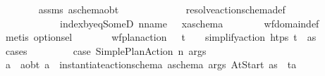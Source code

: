 \begin{isabellebody}
\ \ \ \ \ \ \isamarkupfalse%
\ assms\ a\isactrlsub s\isactrlsub c\isactrlsub h\isactrlsub e\isactrlsub m\isactrlsub a{\isacharunderscore}{\kern0pt}obt\ \isanewline
\ \ \ \ \ \ \ \ \ \ \ \ resolve{\isacharunderscore}{\kern0pt}action{\isacharunderscore}{\kern0pt}schema{\isacharunderscore}{\kern0pt}def\ \isanewline
\ \ \ \ \ \ \ \ \ \ \ \ index{\isacharunderscore}{\kern0pt}by{\isacharunderscore}{\kern0pt}eq{\isacharunderscore}{\kern0pt}SomeD{\isacharbrackleft}{\kern0pt}\ n{\isacharequal}{\kern0pt}{\isachardoublequoteopen}name\ {\isasympi}{\isachardoublequoteclose}\ \ x{\isacharequal}{\kern0pt}{\isachardoublequoteopen}a\isactrlsub s\isactrlsub c\isactrlsub h\isactrlsub e\isactrlsub m\isactrlsub a{\isachardoublequoteclose}{\isacharbrackright}{\kern0pt}\isanewline
\ \ \ \ \ \ \isamarkupfalse%
\ wf{\isacharunderscore}{\kern0pt}domain{\isacharunderscore}{\kern0pt}def\ \isamarkupfalse%
\ {\isacharparenleft}{\kern0pt}metis\ option{\isachardot}{\kern0pt}sel{\isacharparenright}{\kern0pt}\isanewline
\ \ \ \ \isamarkupfalse%
\ \isamarkupfalse%
\ {\isachardoublequoteopen}wf{\isacharunderscore}{\kern0pt}plan{\isacharunderscore}{\kern0pt}action\ {\isasympi}\ {\isasymand}\ t\isactrlsub {\isasympi}\ {\isasymge}\ {}\ {\isasymand}\ simplify{\isacharunderscore}{\kern0pt}action\ htps\ {\isacharparenleft}{\kern0pt}t\isactrlsub {\isasympi}{\isacharcomma}{\kern0pt}{\isasympi}{\isacharparenright}{\kern0pt}\ {\isacharequal}{\kern0pt}\ as{\isachardoublequoteclose}\isanewline
\ \ \ \ \isamarkupfalse%
\ {\isacharparenleft}{\kern0pt}cases\ {\isasympi}{\isacharparenright}{\kern0pt}\isanewline
\ \ \ \ \ \ \isamarkupfalse%
\ case{\isacharunderscore}{\kern0pt}{\isasympi}{\isacharcolon}{\kern0pt}\ {\isacharparenleft}{\kern0pt}Simple{\isacharunderscore}{\kern0pt}Plan{\isacharunderscore}{\kern0pt}Action\ n\ args{\isacharparenright}{\kern0pt}\isanewline
\ \ \ \ \ \ \isamarkupfalse%
\ a\ \ a{\isacharunderscore}{\kern0pt}obt{\isacharcolon}{\kern0pt}\ {\isachardoublequoteopen}a\ {\isacharequal}{\kern0pt}\ instantiate{\isacharunderscore}{\kern0pt}action{\isacharunderscore}{\kern0pt}schema\ a\isactrlsub s\isactrlsub c\isactrlsub h\isactrlsub e\isactrlsub m\isactrlsub a\ args\ At{\isacharunderscore}{\kern0pt}Start{\isasymand}\ as\ {\isacharequal}{\kern0pt}\ {\isacharbrackleft}{\kern0pt}{\isacharparenleft}{\kern0pt}t\isactrlsub {\isasympi}{\isacharcomma}{\kern0pt}a{\isacharparenright}{\kern0pt}{\isacharbrackright}{\kern0pt}{\isachardoublequoteclose}\isanewline

\end{isabellebody}

